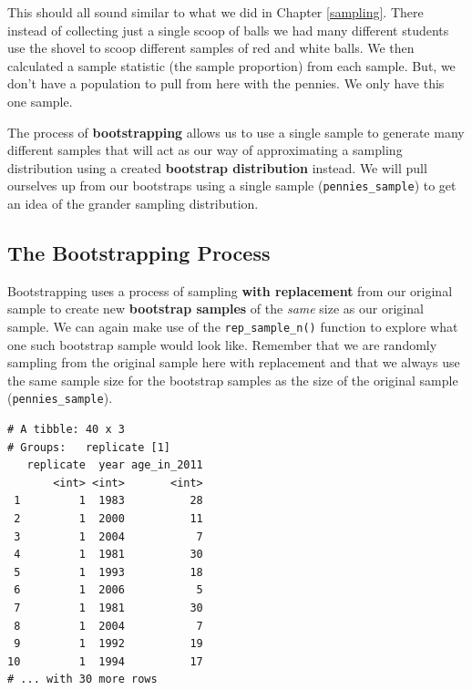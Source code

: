 \documentclass[12pt,]{krantz}
\makeatletter
\newenvironment{Shaded}{\begin{snugshade}}{\end{snugshade}}
\newcommand{\KeywordTok}[1]{\textcolor[rgb]{0.27,0.27,0.27}{\textbf{#1}}}
\newcommand{\DataTypeTok}[1]{\textcolor[rgb]{0.27,0.27,0.27}{#1}}
\newcommand{\DecValTok}[1]{\textcolor[rgb]{0.06,0.06,0.06}{#1}}
\newcommand{\StringTok}[1]{\textcolor[rgb]{0.5,0.5,0.5}{#1}}
\newcommand{\OtherTok}[1]{\textcolor[rgb]{0.37,0.37,0.37}{#1}}
\newcommand{\OperatorTok}[1]{\textcolor[rgb]{0.43,0.43,0.43}{\textbf{#1}}}
\newcommand{\NormalTok}[1]{#1}
\newenvironment{kframe}{%
\medskip{}
\setlength{\fboxsep}{.8em}
 \def\at@end@of@kframe{}%
 \ifinner\ifhmode%
  \def\at@end@of@kframe{\end{minipage}}%
  \begin{minipage}{\columnwidth}%
 \fi\fi%
 \def\FrameCommand##1{\hskip\@totalleftmargin \hskip-\fboxsep
 \colorbox{shadecolor}{##1}\hskip-\fboxsep
     \hskip-\linewidth \hskip-\@totalleftmargin \hskip\columnwidth}%
 \MakeFramed {\advance\hsize-\width
   \@totalleftmargin\z@ \linewidth\hsize
   \@setminipage}}%
 {\par\unskip\endMakeFramed%
 \at@end@of@kframe}
\renewenvironment{Shaded}{\begin{kframe}}{\end{kframe}}
\makeatother
\begin{document}
This should all sound similar to what we did in Chapter \ref{sampling}.
There instead of collecting just a single scoop of balls we had many
different students use the shovel to scoop different samples of red and
white balls. We then calculated a sample statistic (the sample
proportion) from each sample. But, we don't have a population to pull
from here with the pennies. We only have this one sample.

The process of \textbf{bootstrapping} allows us to use a single sample
to generate many different samples that will act as our way of
approximating a sampling distribution using a created \textbf{bootstrap
distribution} instead. We will pull ourselves up from our bootstraps
using a single sample (\texttt{pennies\_sample}) to get an idea of the
grander sampling distribution.

\subsection{The Bootstrapping Process}\label{bootstrap-process}

Bootstrapping uses a process of sampling \textbf{with replacement} from
our original sample to create new \textbf{bootstrap samples} of the
\emph{same} size as our original sample. We can again make use of the
\texttt{rep\_sample\_n()} function to explore what one such bootstrap
sample would look like. Remember that we are randomly sampling from the
original sample here with replacement and that we always use the same
sample size for the bootstrap samples as the size of the original sample
(\texttt{pennies\_sample}).

\begin{Shaded}
\end{Shaded}

\begin{verbatim}
# A tibble: 40 x 3
# Groups:   replicate [1]
   replicate  year age_in_2011
       <int> <int>       <int>
 1         1  1983          28
 2         1  2000          11
 3         1  2004           7
 4         1  1981          30
 5         1  1993          18
 6         1  2006           5
 7         1  1981          30
 8         1  2004           7
 9         1  1992          19
10         1  1994          17
# ... with 30 more rows
\end{verbatim}
\end{document}
